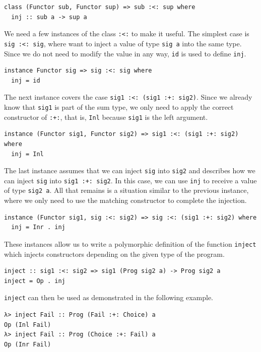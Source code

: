 \documentclass[a4paper, 11pt, fleqn, twoside, abstract=on]{scrreprt}
\newcommand{\hinl}[1]{\texttt{#1}}
\begin{document}
\begin{verbatim}
class (Functor sub, Functor sup) => sub :<: sup where
  inj :: sub a -> sup a
\end{verbatim}

We need a few instances of the class \hinl{:<:} to make it useful.
The simplest case is \hinl{sig :<: sig}, where want to inject a value of type \hinl{sig a} into the same type.
Since we do not need to modify the value in any way, \hinl{id} is used to define \hinl{inj}.

\begin{verbatim}
instance Functor sig => sig :<: sig where
  inj = id  
\end{verbatim}

The next instance covers the case \hinl{sig1 :<: (sig1 :+: sig2)}.
Since we already know that \hinl{sig1} is part of the sum type, we only need to apply the correct constructor of \hinl{:+:}, that is, \hinl{Inl} because \hinl{sig1} is the left argument.

\begin{verbatim}
instance (Functor sig1, Functor sig2) => sig1 :<: (sig1 :+: sig2) where
  inj = Inl
\end{verbatim}

The last instance assumes that we can inject \hinl{sig} into \hinl{sig2} and describes how we can inject \hinl{sig} into \hinl{sig1 :+: sig2}.
In this case, we can use \hinl{inj} to receive a value of type \hinl{sig2 a}.
All that remains is a situation similar to the previous instance, where we only need to use the matching constructor to complete the injection.
 
\begin{verbatim}
instance (Functor sig1, sig :<: sig2) => sig :<: (sig1 :+: sig2) where
  inj = Inr . inj
\end{verbatim}

These instances allow us to write a polymorphic definition of the function \hinl{inject} which injects constructors depending on the given type of the program.

\begin{verbatim}
inject :: sig1 :<: sig2 => sig1 (Prog sig2 a) -> Prog sig2 a
inject = Op . inj
\end{verbatim}

\hinl{inject} can then be used as demonstrated in the following example.

\begin{verbatim}
λ> inject Fail :: Prog (Fail :+: Choice) a
Op (Inl Fail)
λ> inject Fail :: Prog (Choice :+: Fail) a
Op (Inr Fail)
\end{verbatim}
\end{document}
